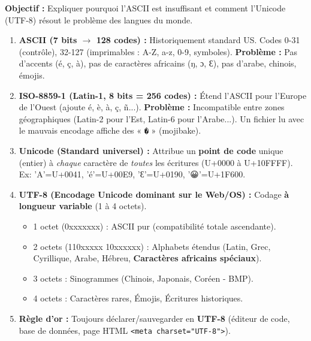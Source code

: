 \documentclass[11pt]{article}
\begin{document}
\begin{methode}
    \textbf{Objectif :} Expliquer pourquoi l'ASCII est insuffisant et comment l'Unicode (UTF-8) résout le problème des langues du monde.
    \begin{enumerate}
        \item \textbf{ASCII (7 bits $\to$ 128 codes) :} Historiquement standard US. Codes 0-31 (contrôle), 32-127 (imprimables : A-Z, a-z, 0-9, symboles). \textbf{Problème :} Pas d'accents (é, ç, à), pas de caractères africains (ŋ, ɔ, Ɛ), pas d'arabe, chinois, émojis.
        \item \textbf{ISO-8859-1 (Latin-1, 8 bits = 256 codes) :} Étend l'ASCII pour l'Europe de l'Ouest (ajoute é, è, à, ç, ñ...). \textbf{Problème :} Incompatible entre zones géographiques (Latin-2 pour l'Est, Latin-6 pour l'Arabe...). Un fichier lu avec le mauvais encodage affiche des « \texttt{�} » (mojibake).
        \item \textbf{Unicode (Standard universel) :} Attribue un \textbf{point de code} unique (entier) à \emph{chaque} caractère de \emph{toutes} les écritures (U+0000 à U+10FFFF). Ex: 'A'=U+0041, 'é'=U+00E9, 'Ɛ'=U+0190, '😀'=U+1F600.
        \item \textbf{UTF-8 (Encodage Unicode dominant sur le Web/OS) :} Codage \textbf{à longueur variable} (1 à 4 octets).
        \begin{itemize}
            \item 1 octet (0xxxxxxx) : ASCII pur (compatibilité totale ascendante).
            \item 2 octets (110xxxxx 10xxxxxx) : Alphabets étendus (Latin, Grec, Cyrillique, Arabe, Hébreu, \textbf{Caractères africains spéciaux}).
            \item 3 octets : Sinogrammes (Chinois, Japonais, Coréen - BMP).
            \item 4 octets : Caractères rares, Émojis, Écritures historiques.
        \end{itemize}
        \item \textbf{Règle d'or :} Toujours déclarer/sauvegarder en \textbf{UTF-8} (éditeur de code, base de données, page HTML \texttt{<meta charset="UTF-8">}).
    \end{enumerate}
\end{methode}
\end{document}
